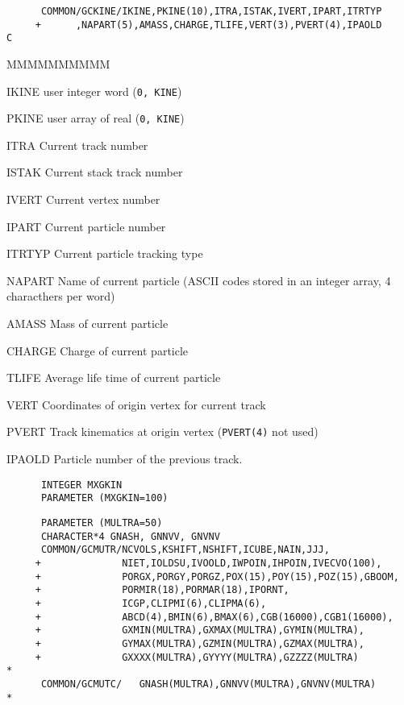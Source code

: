 \begin{verbatim}
      COMMON/GCKINE/IKINE,PKINE(10),ITRA,ISTAK,IVERT,IPART,ITRTYP
     +      ,NAPART(5),AMASS,CHARGE,TLIFE,VERT(3),PVERT(4),IPAOLD
C
\end{verbatim}
\begin{DLtt}{MMMMMMMMMM}
\item[IKINE]  user integer word  ({\tt 0, KINE})
\item[PKINE]  user array of real   ({\tt 0, KINE})
\item[ITRA]   Current track number
\item[ISTAK]Current stack track number
\item[IVERT]Current vertex number
\item[IPART]Current particle number
\item[ITRTYP]Current particle tracking type
\item[NAPART] Name of current particle (ASCII codes stored in an integer
array, 4 characthers per word)
\item[AMASS]  Mass of current particle
\item[CHARGE]Charge of current particle
\item[TLIFE]Average life time of current particle
\item[VERT]Coordinates of origin vertex for current track
\item[PVERT]Track kinematics at origin vertex ({\tt PVERT(4)} not used)
\item[IPAOLD]Particle number of the previous track.
\end{DLtt}
\begin{verbatim}
      INTEGER MXGKIN
      PARAMETER (MXGKIN=100)
\end{verbatim}
\begin{verbatim}
      PARAMETER (MULTRA=50)
      CHARACTER*4 GNASH, GNNVV, GNVNV
      COMMON/GCMUTR/NCVOLS,KSHIFT,NSHIFT,ICUBE,NAIN,JJJ,
     +              NIET,IOLDSU,IVOOLD,IWPOIN,IHPOIN,IVECVO(100),
     +              PORGX,PORGY,PORGZ,POX(15),POY(15),POZ(15),GBOOM,
     +              PORMIR(18),PORMAR(18),IPORNT,
     +              ICGP,CLIPMI(6),CLIPMA(6),
     +              ABCD(4),BMIN(6),BMAX(6),CGB(16000),CGB1(16000),
     +              GXMIN(MULTRA),GXMAX(MULTRA),GYMIN(MULTRA),
     +              GYMAX(MULTRA),GZMIN(MULTRA),GZMAX(MULTRA),
     +              GXXXX(MULTRA),GYYYY(MULTRA),GZZZZ(MULTRA)
*
      COMMON/GCMUTC/   GNASH(MULTRA),GNNVV(MULTRA),GNVNV(MULTRA)
*
\end{verbatim}
